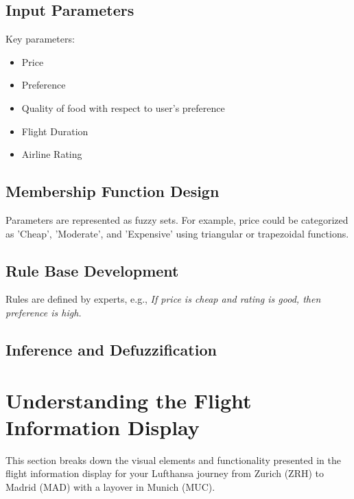 \documentclass[a4paper]{article}
\begin{document}
\subsection{Input Parameters}
Key parameters:
\begin{itemize}
\item Price
\item Preference
\item Quality of food with respect to user's preference
\item Flight Duration
\item Airline Rating
\end{itemize}

\subsection{Membership Function Design}
Parameters are represented as fuzzy sets. For example, price could be categorized as 'Cheap', 'Moderate', and 'Expensive' using triangular or trapezoidal functions.

\subsection{Rule Base Development}
Rules are defined by experts, e.g.,
\textit{If price is cheap and rating is good, then preference is high.}

\subsection{Inference and Defuzzification}

\section{Understanding the Flight Information Display}

This section breaks down the visual elements and functionality presented in the flight information display for your Lufthansa journey from Zurich (ZRH) to Madrid (MAD) with a layover in Munich (MUC).
\end{document}
